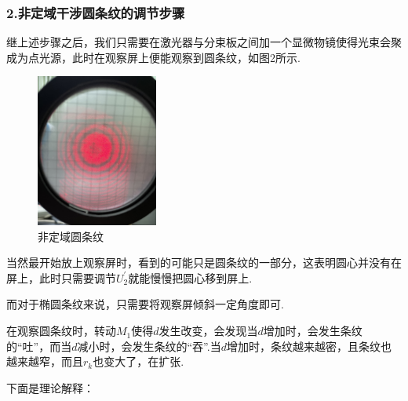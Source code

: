 \documentclass[12pt,a4paper,UTF8]{ctexart}
\begin{document}
\subsubsection*{2.非定域干涉圆条纹的调节步骤}
	继上述步骤之后，我们只需要在激光器与分束板之间加一个显微物镜使得光束会聚成为点光源，此时在观察屏上便能观察到圆条纹，如图2所示.
	\begin{figure}[htbp]
	\centering
		\includegraphics[width=4cm]{ganshe.jpg}
		\caption{非定域圆条纹}
	\end{figure}
	\newpage
	当然最开始放上观察屏时，看到的可能只是圆条纹的一部分，这表明圆心并没有在屏上，此时只需要调节$U_2^{\prime}$就能慢慢把圆心移到屏上.\par
	而对于椭圆条纹来说，只需要将观察屏倾斜一定角度即可.\par
	在观察圆条纹时，转动$M_1$使得$d$发生改变，会发现当$d$增加时，会发生条纹的“吐”，而当$d$减小时，会发生条纹的“吞”.当$d$增加时，条纹越来越密，且条纹也越来越窄，而且$r_k$也变大了，在扩张.\par
	下面是理论解释：
\end{document}

